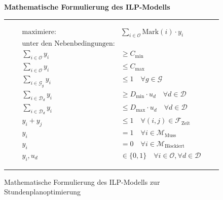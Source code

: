 \begin{figure}[!ht]
    \centering
    \begin{minipage}{.95\linewidth}
        \centering
        \textbf{Mathematische Formulierung des ILP-Modells}
        \vspace{0.5em}
        \hrule
        \begin{align}
            \text{maximiere: }             & \sum_{i \in \mathcal{O}} \text{Mark}(i) \cdot y_i \label{eq:objective}                    \\
            \text{unter den Nebenbedingungen:} \nonumber                                                                               \\
            \sum_{i \in \mathcal{O}} y_i   & \geq C_{\min} \label{eq:count_min}                                                        \\
            \sum_{i \in \mathcal{O}} y_i   & \leq C_{\max} \label{eq:count_max}                                                        \\
            \sum_{i \in \mathcal{G}_g} y_i & \leq 1 \quad \forall g \in \mathcal{G} \label{eq:group_constraint}                        \\
            \sum_{i \in \mathcal{D}_d} y_i & \geq D_{\min} \cdot u_d \quad \forall d \in \mathcal{D} \label{eq:daily_min}              \\
            \sum_{i \in \mathcal{D}_d} y_i & \leq D_{\max} \cdot u_d \quad \forall d \in \mathcal{D} \label{eq:daily_max}              \\
            y_i + y_j                      & \leq 1 \quad \forall (i, j) \in \mathcal{F}_{\text{Zeit}} \label{eq:conflict_overlap}     \\
            y_i                            & = 1 \quad \forall i \in \mathcal{M}_{\text{Muss}} \label{eq:must_schedule}                \\
            y_i                            & = 0 \quad \forall i \in \mathcal{M}_{\text{Blockiert}} \label{eq:must_not_schedule}       \\
            y_i, u_d                       & \in \{0, 1\} \quad \forall i \in \mathcal{O}, \forall d \in \mathcal{D} \label{eq:binary}
        \end{align}
        \hrule
    \end{minipage}
    \caption{Mathematische Formulierung des ILP-Modells zur Stundenplanoptimierung}
    \label{fig:ilp_model}
\end{figure}


